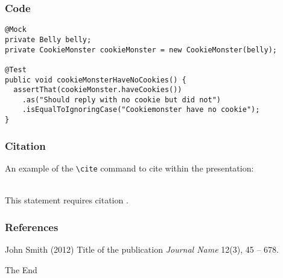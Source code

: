 \documentclass{beamer}
\begin{document}
\begin{frame}[fragile]
\frametitle{Code}
\begin{example}[Code]
\begin{lstlisting}
@Mock
private Belly belly;
private CookieMonster cookieMonster = new CookieMonster(belly);

@Test
public void cookieMonsterHaveNoCookies() {
  assertThat(cookieMonster.haveCookies())
    .as("Should reply with no cookie but did not")
    .isEqualToIgnoringCase("Cookiemonster have no cookie");
}
\end{lstlisting}
\end{example}
\end{frame}

\begin{frame}[fragile] %
\frametitle{Citation}
An example of the \verb|\cite| command to cite within the presentation:\\~

This statement requires citation \cite{p1}.
\end{frame}


\begin{frame}
\frametitle{References}
\footnotesize{
\begin{thebibliography}{99} %
 John Smith (2012)
\newblock Title of the publication
\newblock \emph{Journal Name} 12(3), 45 -- 678.
\end{thebibliography}
}
\end{frame}


\begin{frame}
\Huge{\centerline{The End}}
\end{frame}

\end{document}
